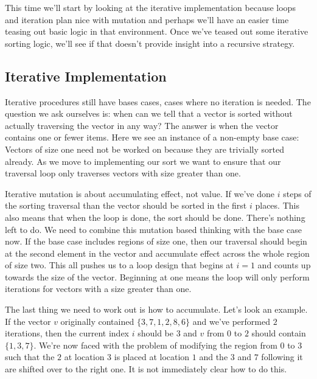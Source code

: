 \documentclass[]{tufte-handout}
\begin{document}
This time we'll start by looking at the iterative implementation because loops and iteration plan nice with mutation and perhaps we'll have an easier time teasing out basic logic in that environment. Once we've teased out some iterative sorting logic, we'll see if that doesn't provide insight into a recursive strategy.

\subsection{Iterative Implementation}

Iterative procedures still have bases cases, cases where no iteration is needed. The question we ask ourselves is: when can we tell that a vector is sorted without actually traversing the vector in any way? The answer is when the vector contains one or fewer items. Here we see an instance of a non-empty base case: Vectors of size one need not be worked on because they are trivially sorted already. As we move to implementing our sort we want to ensure that our traversal loop only traverses vectors with size greater than one.

Iterative mutation is about accumulating effect, not value. If we've done $i$ steps of the sorting traversal than the vector should be sorted in the first $i$ places. This also means that when the loop is done, the sort should be done. There's nothing left to do. We need to combine this mutation based thinking with the base case now.  If the base case includes regions of size one, then our traversal should begin at the second element in the vector and accumulate effect across the whole region of size two. This all pushes us to a loop design that begins at $i=1$ and counts up towards the size of the vector. Beginning at one means the loop will only perform iterations for vectors with a size greater than one.

The last thing we need to work out is how to accumulate. Let's look an example. If the vector $v$ originally contained $\{3,7,1,2,8,6\}$ and we've performed $2$ iterations, then the current index $i$ should be $3$ and $v$ from $0$ to $2$ should contain $\{1,3,7\}$. We're now faced with the problem of modifying the region from $0$ to $3$ such that the $2$ at location $3$ is placed at location $1$ and the $3$ and $7$ following it are shifted over to the right one. It is not immediately clear how to do this.
\end{document}
